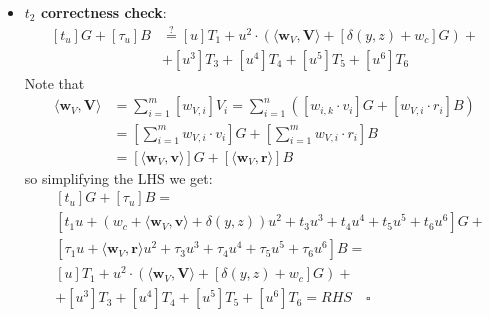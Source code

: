 \documentclass[../lecture-notes-148x210.tex]{subfiles}
\begin{document}
\begin{itemize}
\begin{equation*}
\begin{aligned}
            &- \langle \mathbf{y}^n, \mathbf{y}^{-n} \circ \mathbf{H} \rangle + \langle \mathbf{w}_O, \mathbf{y}^{-n} \circ \mathbf{H} \rangle + [\alpha u + \gamma u^2 + \beta u^3]B \\
            &= \textcolor{Violet}{u^3 \cdot \langle \mathbf{s}_L, \mathbf{G} \rangle} + \textcolor{teal}{u^2 \cdot \langle \mathbf{a}_O, \mathbf{G} \rangle} + \textcolor{Sepia}{u \cdot \langle \mathbf{a}_L, \mathbf{G}\rangle + u \cdot \langle \mathbf{y}^{-n} \circ \mathbf{w}_R, \mathbf{G} \rangle} + \\
            &+\textcolor{Violet}{u^3 \cdot \langle \mathbf{s}_R, \mathbf{H} \rangle} + \textcolor{Sepia}{u \cdot \langle \mathbf{a}_R, \mathbf{H} \rangle + u \cdot \langle \mathbf{w}_L, \mathbf{y}^n \circ \mathbf{H} \rangle} \\
            &\textcolor{gray}{- \langle \mathbf{1}^n, \mathbf{H} \rangle + \langle \mathbf{w}_O, \mathbf{y}^{-n} \circ \mathbf{H} \rangle} + \textcolor{RubineRed}{[\alpha u]B + [\gamma u^2]B + [\beta u^3]B}
        \end{aligned}
    \end{equation*}
    As we see $LHS=RHS$ so the check holds.
    \item \textbf{$t_2$ correctness check}:
    \begin{equation*}
        \begin{aligned}
            [t_u]G + [\tau_u]B &\stackrel{\text{?}}{=} [u]T_1 + u^2 \cdot (\langle \mathbf{w}_V, \mathbf{V} \rangle + [\delta(y,z) + w_c]G) +\\
            &+ [u^3]T_3 + [u^4]T_4 + [u^5]T_5 + [u^6]T_6
        \end{aligned}
    \end{equation*}
    Note that 
    \begin{align*}
        \langle \mathbf{w}_V, \mathbf{V} \rangle &= \sum_{i=1}^m [w_{V,i}]V_i = \sum_{i=1}^n ([w_{i, k} \cdot v_i]G + [w_{V, i} \cdot r_i]B) \\
        &= [\sum_{i=1}^m w_{V, i} \cdot v_i]G + [\sum_{i=1}^m w_{V, i} \cdot r_i]B \\
        &= [\langle \mathbf{w}_V, \mathbf{v} \rangle] G + [\langle \mathbf{w}_V, \mathbf{r} \rangle] B
    \end{align*}
    so simplifying the LHS we get:
    \begin{equation*}
        \begin{aligned}
            &[t_u]G + [\tau_u]B = \\
            & [t_1 u + (w_c + \langle \mathbf{w}_V, \mathbf{v} \rangle + \delta(y, z)) u^2 + t_3 u^3 + t_4 u^4 + t_5 u^5 + t_6 u^6]G + \\
            & [\tau_1 u + \langle \mathbf{w}_V, \mathbf{r} \rangle u^2 + \tau_3 u^3 + \tau_4 u^4 + \tau_5 u^5 + \tau_6 u^6]B = \\
            & [u]T_1 + u^2 \cdot (\langle \mathbf{w}_V, \mathbf{V} \rangle + [\delta(y,z) + w_c]G) +\\
            &+ [u^3]T_3 + [u^4]T_4 + [u^5]T_5 + [u^6]T_6 = RHS \quad \square
        \end{aligned}
    \end{equation*}
\end{itemize}
\end{document}
